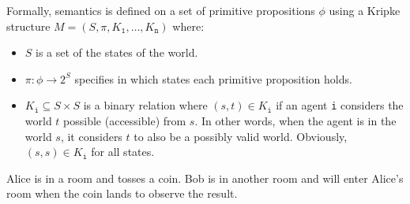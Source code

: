 \begin{description}
        Formally, semantics is defined on a set of primitive propositions $\phi$ 
        using a Kripke structure $M = (S, \pi, K_\texttt{1}, \dots, K_\texttt{n})$ where:
        \begin{itemize}
            \item $S$ is a set of the states of the world.
            \item $\pi: \phi \rightarrow 2^S$ specifies in which states each primitive proposition holds.
            \item $K_\texttt{i} \subseteq S \times S$ is a binary relation where 
                $(s, t) \in K_\texttt{i}$ if an agent \texttt{i} considers the world $t$ possible (accessible) from $s$.
                In other words, when the agent is in the world $s$, it considers $t$ to also be a possibly valid world.
                Obviously, $(s, s) \in K_\texttt{i}$ for all states.
        \end{itemize}

        \begin{example}
            Alice is in a room and tosses a coin. Bob is in another room and will enter Alice's room when the coin lands to observe the result.


\end{example}
\end{description}
